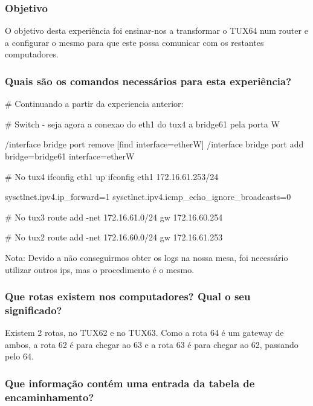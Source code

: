\documentclass[11pt,a4paper,twocolumn]{article}
\begin{document}
\subsubsection{Objetivo}

O objetivo desta experiência foi ensinar-nos a transformar o TUX64 num router e a configurar o mesmo para que este possa comunicar com os restantes computadores.

\subsubsection{Quais são os comandos necessários para esta experiência?}

\begin{bash-darktheme}
        # Continuando a partir da experiencia anterior:

        # Switch - seja agora a conexao do eth1 do tux4 a bridge61 pela porta W

        /interface bridge port remove [find interface=etherW]
        /interface bridge port add bridge=bridge61 interface=etherW

        # No tux4
        ifconfig eth1 up
        ifconfig eth1 172.16.61.253/24

        sysctlnet.ipv4.ip_forward=1
        sysctlnet.ipv4.icmp_echo_ignore_broadcasts=0
        
        # No tux3
        route add -net 172.16.61.0/24 gw 172.16.60.254
        
        # No tux2
        route add -net 172.16.60.0/24 gw 172.16.61.253

\end{bash-darktheme}

Nota: Devido a não conseguirmos obter os logs na nossa mesa, foi necessário utilizar outros ips, mas o procedimento é o mesmo.

\subsubsection{Que rotas existem nos computadores? Qual o seu significado?}
    
Existem 2 rotas, no TUX62 e no TUX63. Como a rota 64 é um gateway de ambos, a rota 62 é para chegar ao 63 e a rota 63 é para chegar ao 62, passando pelo 64. 

\subsubsection{Que informação contém uma entrada da tabela de encaminhamento?}
\end{document}
